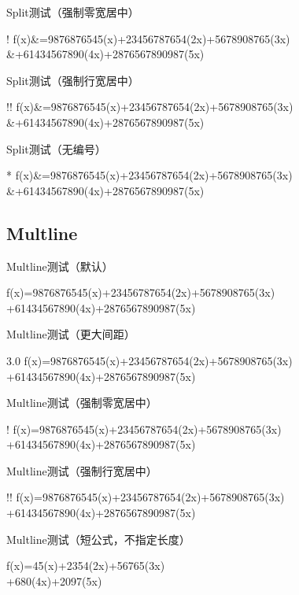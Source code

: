 Split测试（强制零宽居中）
\begin{Split}[Split3]!
    f(x)&=9876876545\cos(x)+23456787654\cos(2x)+5678908765\cos(3x)\\
    &+61434567890\cos(4x)+2876567890987\cos(5x)
\end{Split}

Split测试（强制行宽居中）
\begin{Split}[Split4]!!
    f(x)&=9876876545\cos(x)+23456787654\cos(2x)+5678908765\cos(3x)\\
    &+61434567890\cos(4x)+2876567890987\cos(5x)
\end{Split}

Split测试（无编号）
\begin{Split}*
    f(x)&=9876876545\cos(x)+23456787654\cos(2x)+5678908765\cos(3x)\\
    &+61434567890\cos(4x)+2876567890987\cos(5x)
\end{Split}

\subsection{Multline}
Multline测试（默认）
\begin{Multline}[Multline1]
    f(x)=9876876545\cos(x)+23456787654\cos(2x)+5678908765\cos(3x)\\
    +61434567890\cos(4x)+2876567890987\cos(5x)
\end{Multline}

Multline测试（更大间距）
\begin{Multline}[Multline2]{3.0}
    f(x)=9876876545\cos(x)+23456787654\cos(2x)+5678908765\cos(3x)\\
    +61434567890\cos(4x)+2876567890987\cos(5x)
\end{Multline}

Multline测试（强制零宽居中）
\begin{Multline}[Multline3]!
    f(x)=9876876545\cos(x)+23456787654\cos(2x)+5678908765\cos(3x)\\
    +61434567890\cos(4x)+2876567890987\cos(5x)
\end{Multline}

Multline测试（强制行宽居中）
\begin{Multline}[Multline4]!!
    f(x)=9876876545\cos(x)+23456787654\cos(2x)+5678908765\cos(3x)\\
    +61434567890\cos(4x)+2876567890987\cos(5x)
\end{Multline}

Multline测试（短公式，不指定长度）
\begin{Multline}[Multline5]
    f(x)=45\cos(x)+2354\cos(2x)+56765\cos(3x)\\
    +680\cos(4x)+2097\cos(5x)
\end{Multline}

